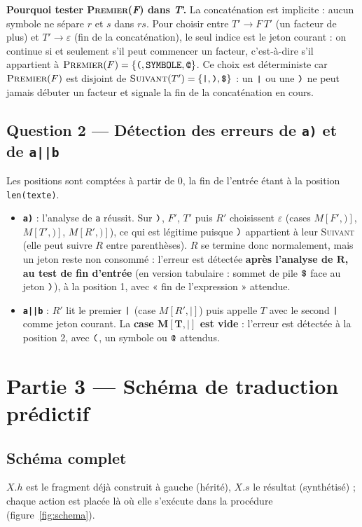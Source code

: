 \documentclass[12pt,a4paper]{article}
\newcommand{\code}[1]{{\fontsize{10}{12}\selectfont\texttt{#1}}}
\newcommand{\eps}{\ensuremath{\varepsilon}}
\newcommand{\Prem}{\textsc{Premier}}
\newcommand{\Suiv}{\textsc{Suivant}}
\newcommand{\tok}[1]{\ensuremath{\text{\fontsize{10}{12}\selectfont\ttfamily #1}}}
\begin{document}
\textbf{Pourquoi tester \Prem(\textit{F}) dans \textit{T}'.} La concaténation est
implicite : aucun symbole ne sépare $r$ et $s$ dans $rs$. Pour choisir entre $T' \to F\,T'$
(un facteur de plus) et $T' \to \varepsilon$ (fin de la concaténation), le seul indice est le
jeton courant : on continue si et seulement s'il peut commencer un facteur, c'est-à-dire s'il
appartient à $\Prem(F) = \{\texttt{(}, \texttt{SYMBOLE}, \texttt{@}\}$. Ce choix est
déterministe car $\Prem(F)$ est disjoint de $\Suiv(T') = \{\texttt{|}, \texttt{)}, \texttt{\$}\}$ :
un \tok{|} ou une \tok{)} ne peut jamais débuter un facteur et signale la fin de la
concaténation en cours.

\subsection{Question 2 --- Détection des erreurs de \texttt{a)} et de \texttt{a||b}}

Les positions sont comptées à partir de 0, la fin de l'entrée étant à la position
\code{len(texte)}.
\begin{itemize}
\item \textbf{\texttt{a)}} : l'analyse de \code{a} réussit. Sur \tok{)}, $F'$, $T'$ puis $R'$
  choisissent \eps{} (cases $M[F', \texttt{)}]$, $M[T', \texttt{)}]$, $M[R', \texttt{)}]$), ce qui
  est légitime puisque \tok{)} appartient à leur \Suiv{} (elle peut suivre $R$ entre
  parenthèses). $R$ se termine donc normalement, mais un jeton reste non consommé : l'erreur est
  détectée \textbf{après l'analyse de $\boldsymbol{R}$, au test de fin d'entrée} (en version
  tabulaire : sommet de pile \tok{\$} face au jeton \tok{)}), à la position 1, avec « fin de
  l'expression » attendue.
\item \textbf{\texttt{a||b}} : $R'$ lit le premier \tok{|} (case $M[R', \texttt{|}]$) puis appelle
  $T$ avec le second \tok{|} comme jeton courant. La \textbf{case $\boldsymbol{M[T,
  \texttt{|}]}$ est vide} : l'erreur est détectée à la position 2, avec \tok{(}, un symbole ou
  \tok{@} attendus.
\end{itemize}
\section{Partie 3 --- Schéma de traduction prédictif}

\subsection{Schéma complet}
$X.h$ est le fragment déjà construit à gauche (hérité), $X.s$ le résultat (synthétisé) ;
chaque action est placée là où elle s'exécute dans la procédure (figure~\ref{fig:schema}).
\end{document}
